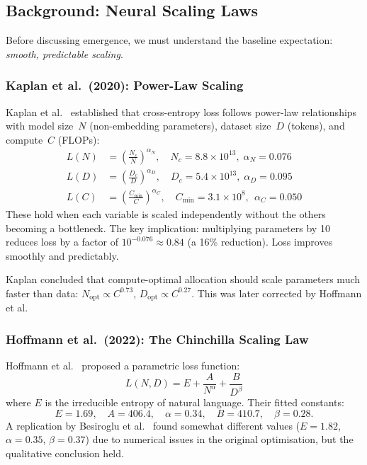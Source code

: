 \documentclass[11pt, a4paper]{article}
\theoremstyle{definition}
\theoremstyle{plain}
\begin{document}
\subsection{Background: Neural Scaling Laws}

Before discussing emergence, we must understand the baseline expectation: \emph{smooth, predictable scaling}.

\subsubsection{Kaplan et al.\ (2020): Power-Law Scaling}

Kaplan et al.~\cite{kaplan2020scaling} established that cross-entropy loss follows power-law relationships with model size~$N$ (non-embedding parameters), dataset size~$D$ (tokens), and compute~$C$ (FLOPs):
\begin{align}
  L(N) &= \left(\frac{N_c}{N}\right)^{\alpha_N}, \quad N_c = 8.8 \times 10^{13},\; \alpha_N = 0.076 \label{eq:kaplan-n} \\
  L(D) &= \left(\frac{D_c}{D}\right)^{\alpha_D}, \quad D_c = 5.4 \times 10^{13},\; \alpha_D = 0.095 \label{eq:kaplan-d} \\
  L(C) &= \left(\frac{C_{\min}}{C}\right)^{\alpha_C}, \quad C_{\min} = 3.1 \times 10^{8},\;\, \alpha_C = 0.050 \label{eq:kaplan-c}
\end{align}
These hold when each variable is scaled independently without the others becoming a bottleneck. The key implication: multiplying parameters by 10 reduces loss by a factor of $10^{-0.076} \approx 0.84$ (a 16\% reduction). Loss improves smoothly and predictably.

Kaplan concluded that compute-optimal allocation should scale parameters much faster than data: $N_{\mathrm{opt}} \propto C^{0.73}$, $D_{\mathrm{opt}} \propto C^{0.27}$. This was later corrected by Hoffmann et al.

\subsubsection{Hoffmann et al.\ (2022): The Chinchilla Scaling Law}

Hoffmann et al.~\cite{hoffmann2022chinchilla} proposed a parametric loss function:
\begin{equation}
  L(N, D) = E + \frac{A}{N^{\alpha}} + \frac{B}{D^{\beta}}
  \label{eq:chinchilla}
\end{equation}
where $E$ is the irreducible entropy of natural language. Their fitted constants:
\[
  E = 1.69,\quad A = 406.4,\quad \alpha = 0.34,\quad B = 410.7,\quad \beta = 0.28.
\]
A replication by Besiroglu et al.~\cite{besiroglu2024chinchilla} found somewhat different values ($E = 1.82$, $\alpha = 0.35$, $\beta = 0.37$) due to numerical issues in the original optimisation, but the qualitative conclusion held.
\end{document}
